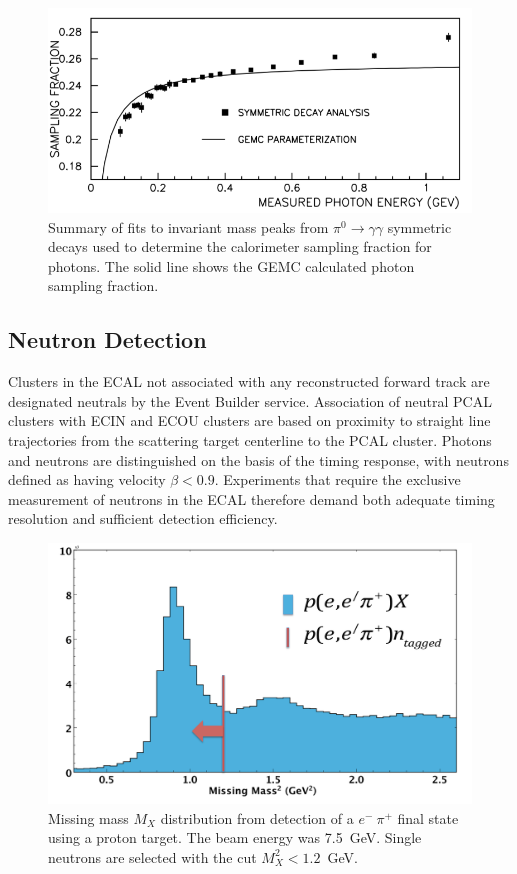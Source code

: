 \begin{figure}[h]
\centering
\includegraphics[width=1.0\columnwidth,keepaspectratio]{img/fx-study-summary-2.png}
\caption[]{Summary of fits to invariant mass peaks from $\pi^0 \rightarrow \gamma \gamma$ symmetric decays
  used to determine the calorimeter sampling fraction for photons. The solid line shows the GEMC calculated
  photon sampling fraction.}
\label{fig:fx-study-summary-2}
\end{figure}

\subsection{Neutron Detection}

Clusters in the ECAL not associated with any reconstructed forward track are designated neutrals by the Event
Builder service. Association of neutral PCAL clusters with ECIN and ECOU clusters are based on proximity to
straight line trajectories from the scattering target centerline to the PCAL cluster. Photons and neutrons are
distinguished on the basis of the timing response, with neutrons defined as having velocity $\beta < 0.9$.
Experiments that require the exclusive measurement of neutrons in the ECAL therefore demand both adequate timing
resolution and sufficient detection efficiency. 

\begin{figure}[h]
\centering
\includegraphics[width=1.0\columnwidth,keepaspectratio]{img/S10_4_0.png}
\caption[]{Missing mass $M_X$ distribution from detection of a $e^-~\pi^+$ final state using a proton target. The
  beam energy was 7.5~GeV. Single neutrons are selected with the cut $M_X^2 < 1.2$~GeV.}
\label{fig:S10_4_0}
\end{figure}


